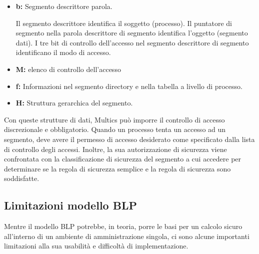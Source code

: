 \begin{itemize}
    \item \textbf{b:} Segmento descrittore parola.
    
    Il segmento descrittore identifica il soggetto (processo). Il puntatore di segmento nella parola descrittore di segmento identifica l'oggetto (segmento dati). I tre bit di controllo dell'accesso nel segmento descrittore di segmento identificano il modo di accesso.
    
    \item \textbf{M:} elenco di controllo dell'accesso
    
    \item \textbf{f:} Informazioni nel segmento directory e nella tabella a livello di processo.
    
    \item \textbf{H:} Struttura gerarchica del segmento.

\end{itemize}

Con queste strutture di dati, Multics può imporre il controllo di accesso discrezionale e obbligatorio. Quando un processo tenta un accesso ad un segmento, deve avere il permesso di accesso desiderato come specificato dalla lista di controllo degli accessi. Inoltre, la sua autorizzazione di sicurezza viene confrontata con la classificazione di sicurezza del segmento a cui accedere per determinare se la regola di sicurezza semplice e la regola di sicurezza sono soddisfatte.

\subsection{Limitazioni modello BLP}
Mentre il modello BLP potrebbe, in teoria, porre le basi per un calcolo sicuro all'interno di un ambiente di amministrazione singola, ci sono alcune importanti limitazioni alla sua usabilità e difficoltà di implementazione.

